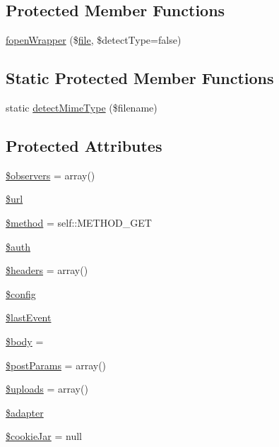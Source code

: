 \subsection*{Protected Member Functions}
\begin{DoxyCompactItemize}
\item 
\hyperlink{classHTTP__Request2_a1d4b42d63213562467f393e34c7a76dc}{fopen\+Wrapper} (\$\hyperlink{classfile}{file}, \$detect\+Type=false)
\end{DoxyCompactItemize}
\subsection*{Static Protected Member Functions}
\begin{DoxyCompactItemize}
\item 
static \hyperlink{classHTTP__Request2_ac1b8f0776d5faf41503d440350c8b6d6}{detect\+Mime\+Type} (\$filename)
\end{DoxyCompactItemize}
\subsection*{Protected Attributes}
\begin{DoxyCompactItemize}
\item 
\hyperlink{classHTTP__Request2_ab57c87d4bee6cb35be6b976a8ec7ec2f}{\$observers} = array()
\item 
\hyperlink{classHTTP__Request2_acf16b4d76ebd04a80dc8e140303ad895}{\$url}
\item 
\hyperlink{classHTTP__Request2_ae83c79d14f1b596d91b60862ea1370af}{\$method} = self\+::\+M\+E\+T\+H\+O\+D\+\_\+\+G\+E\+T
\item 
\hyperlink{classHTTP__Request2_a4c1219356a8c669730a1fe09bd8f81b1}{\$auth}
\item 
\hyperlink{classHTTP__Request2_a0d70f1b39d77f1e8bca7cd984d25192e}{\$headers} = array()
\item 
\hyperlink{classHTTP__Request2_a4043f1c6f00d8b92d2b3dcb5ecd2861e}{\$config}
\item 
\hyperlink{classHTTP__Request2_a53a051d2cfcad3fc688b7974c996e750}{\$last\+Event}
\item 
\hyperlink{classHTTP__Request2_af7de92496442c98589954db8327f9faf}{\$body} = \textquotesingle{}\textquotesingle{}
\item 
\hyperlink{classHTTP__Request2_a77aa571439401e1cd2adc407f4bdc222}{\$post\+Params} = array()
\item 
\hyperlink{classHTTP__Request2_ad95bfff299ff890d4f554754428337e5}{\$uploads} = array()
\item 
\hyperlink{classHTTP__Request2_a4de3f606051b53b314179271f9bd0173}{\$adapter}
\item 
\hyperlink{classHTTP__Request2_a1a4f35074ef955bfe726e85b76ed17a9}{\$cookie\+Jar} = null
\end{DoxyCompactItemize}


